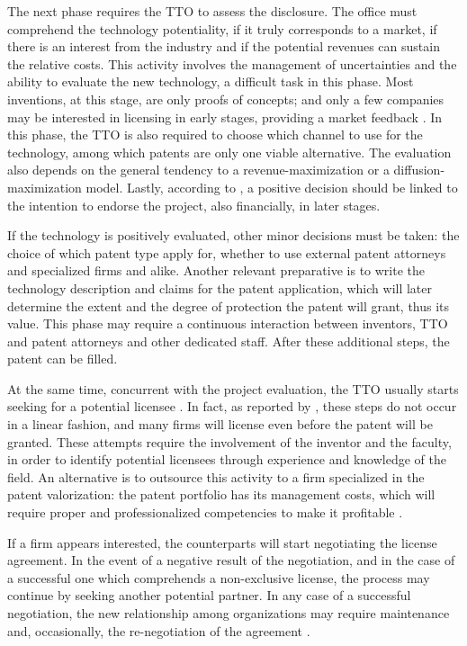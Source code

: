 The next phase requires the TTO to assess the disclosure. The office must comprehend the technology potentiality, if it truly corresponds to a market, if there is an interest from the industry and if the potential revenues can sustain the relative costs. This activity involves the management of uncertainties and the ability to evaluate the new technology, a difficult task in this phase. Most inventions, at this stage, are only proofs of concepts; and only a few companies may be interested in licensing in early stages, providing a market feedback \citep{Jensen2003}. In this phase, the TTO is also required to choose which channel to use for the technology, among which patents are only one viable alternative. The evaluation also depends on the general tendency to a revenue-maximization or a diffusion-maximization model. Lastly, according to \citet{McAdam2005}, a positive decision should be linked to the intention to endorse the project, also financially, in later stages.

If the technology is positively evaluated, other minor decisions must be taken: the choice of which patent type apply for, whether to use external patent attorneys and specialized firms and alike. Another relevant preparative is to write the technology description and claims for the patent application, which will later determine the extent and the degree of protection the patent will grant, thus its value. This phase may require a continuous interaction between inventors, TTO and patent attorneys and other dedicated staff. After these additional steps, the patent can be filled.

At the same time, concurrent with the project evaluation, the TTO usually starts seeking for a potential licensee \citep{Markman2005}. In fact, as reported by \citet{Siegel2003a}, these steps do not occur in a linear fashion, and many firms will license even before the patent will be granted. These attempts require the involvement of the inventor and the faculty, in order to identify potential licensees through experience and knowledge of the field. An alternative is to outsource this activity to a firm specialized in the patent valorization: the patent portfolio has its management costs, which will require proper and professionalized competencies to make it profitable \citep{Balderi2010}. 

If a firm appears interested, the counterparts will start negotiating the license agreement. In the event of a negative result of the negotiation, and in the case of a successful one which comprehends a non-exclusive license, the process may continue by seeking another potential partner. In any case of a successful negotiation, the new relationship among organizations may require maintenance and, occasionally, the re-negotiation of the agreement \citep{Siegel2003a}. 

